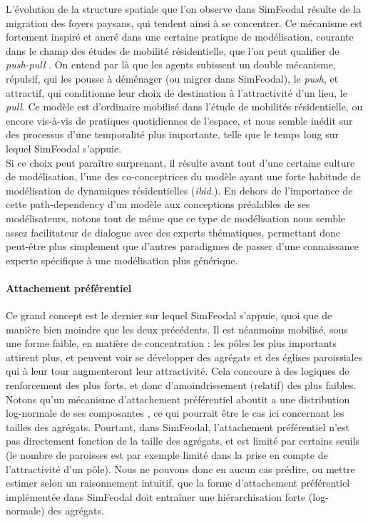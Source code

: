 L'évolution de la structure spatiale que l'on observe dans SimFeodal résulte de la migration des foyers paysans, qui tendent ainsi à se concentrer.
Ce mécanisme est fortement inspiré et ancré dans une certaine pratique de modélisation, courante dans le champ des études de mobilité résidentielle, que l'on peut qualifier de \og \textit{push-pull}\fg{} \autocite{tannier_analyse_2017}.
On entend par là que les agents subissent un double mécanisme, répulsif, qui les pousse à déménager (ou migrer dans SimFeodal), le \textit{push}, et attractif, qui conditionne leur choix de destination à l'attractivité d'un lieu, le \textit{pull}.
Ce modèle est d'ordinaire mobilisé dans l'étude de mobilités résidentielle, ou encore vis-à-vis de pratiques quotidiennes de l'espace, et nous semble inédit sur des processus d'une temporalité plus importante, telle que le temps long sur lequel SimFeodal s'appuie.\\
Si ce choix peut paraître surprenant, il résulte avant tout d'une certaine \og culture de modélisation\fg{}, l'une des co-conceptrices du modèle ayant une forte habitude de modélisation de dynamiques résidentielles (\textit{ibid.}).
En dehors de l'importance de cette \og path-dependency\fg{} d'un modèle aux conceptions préalables de ses modélisateurs, notons tout de même que ce type de modélisation nous semble assez facilitateur de dialogue avec des experts thématiques, permettant donc peut-être plus simplement que d'autres paradigmes de passer d'une connaissance experte spécifique à une modélisation plus générique.

\paragraph{Attachement préférentiel} Ce \og grand concept\fg{} est le dernier sur lequel SimFeodal s'appuie, quoi que de manière bien moindre que les deux précédents.
Il est néanmoins mobilisé, sous une forme faible, en matière de concentration : les pôles les plus importants attirent plus, et peuvent voir se développer des agrégats et des églises paroissiales qui à leur tour augmenteront leur attractivité.
Cela concoure à des logiques de renforcement des plus forts, et donc d'amoindrissement (relatif) des plus faibles.
Notons qu'un mécanisme d'attachement préférentiel aboutit a une distribution log-normale de ses composantes \autocite{barabasi_emergence_1999}, ce qui pourrait être le cas ici concernant les tailles des agrégats.
Pourtant, dans SimFeodal, l'attachement préférentiel n'est pas directement fonction de la taille des agrégats, et est limité par certains seuils (le nombre de paroisses est par exemple limité dans la prise en compte de l'attractivité d'un pôle).
Nous ne pouvons donc en aucun cas prédire, ou mettre estimer selon un raisonnement intuitif, que la forme d'attachement préférentiel implémentée dans SimFeodal doit entraîner une hiérarchisation forte (log-normale) des agrégats. 

